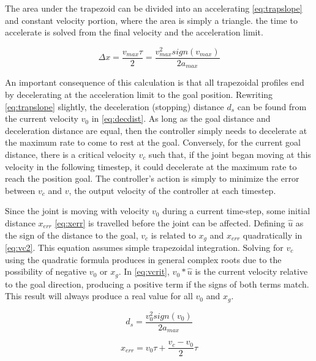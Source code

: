 The area under the trapezoid can be divided into an accelerating
\eqref{eq:trapslope} and constant velocity portion, where the area is simply a
triangle. the time to accelerate is solved from the final velocity and the
acceleration limit.

\begin{equation}
\label{eq:trapslope}
\Delta x=\frac{v_{max}\tau}{2}=\frac{v_{max}^2 sign(v_{max})}{2a_{max}}
\end{equation}

An important consequence of this calculation is that all trapezoidal profiles
end by decelerating at the acceleration limit to the goal position. Rewriting
\eqref{eq:trapslope} slightly, the deceleration (stopping) distance $d_s$ can be found
from the current velocity $v_0$ in \eqref{eq:decdist}. As long as the goal
distance and deceleration distance are equal, then the controller simply
needs to decelerate at the maximum rate to come to rest at the goal.
Conversely, for the current goal distance, there is a critical velocity $v_c$
such that, if the joint began moving at this velocity in the following
timestep, it could decelerate at the maximum rate to reach the position goal.
The controller's action is simply to minimize the error between $v_c$ and $v$,
the output velocity of the controller at each timestep.

Since the joint is moving with velocity $v_0$ during a current time-step, some
initial distance $x_{err}$ \eqref{eq:xerr} is travelled before the joint can be
affected. Defining $\hat{u}$ as the sign of the distance to the goal, $v_c$ is
related to $x_g$ and $x_{err}$ quadratically in \eqref{eq:vc2}. This equation
assumes simple trapezoidal integration. Solving for $v_c$ using the quadratic
formula produces in general complex roots due to the possibility of negative
$v_0$ or $x_g$.  In \eqref{eq:vcrit}, $v_0*\hat{u}$ is the current velocity
relative to the goal direction, producing a positive term if the signs of both
terms match. This result will always produce a real value for all $v_0$ and
$x_g$.

\begin{equation}
\label{eq:decdist}
d_s=\frac{v_0^2 sign(v_0)}{2 a_{max}}
\end{equation}

\begin{equation}
\label{eq:xerr}
x_{err}=v_0 \tau + \frac{v_c-v_0}{2}\tau
\end{equation}

